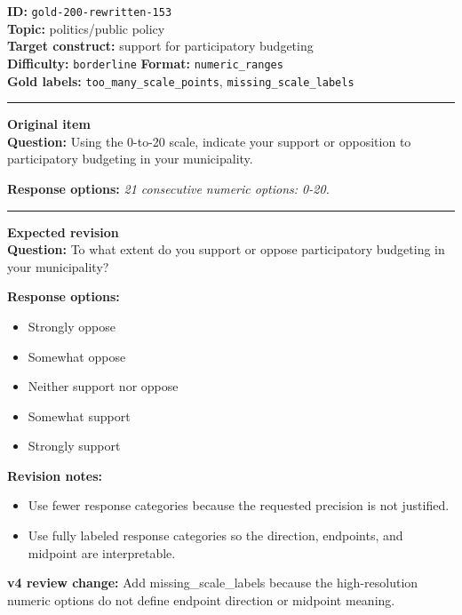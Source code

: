 \documentclass[10pt,a4paper]{article}
\newcommand{\sectionline}{\vspace{0.15em}\hrule\vspace{0.35em}}
\begin{document}
\begin{tcolorbox}[colframe=FlawRed,colback=white,colbacktitle=FlawRed!9,coltitle=black,title={Item 153\hfill Flawed item}]
\textbf{ID:} \texttt{gold-200-rewritten-153}\\
\textbf{Topic:} politics/public policy\\
\textbf{Target construct:} support for participatory budgeting\\
\textbf{Difficulty:} \texttt{borderline} \quad \textbf{Format:} \texttt{numeric\_ranges}\\
\textbf{Gold labels:} \texttt{too\_many\_scale\_points}, \texttt{missing\_scale\_labels}\\
\sectionline
\textbf{Original item}\\
\textbf{Question:} Using the 0-to-20 scale, indicate your support or opposition to participatory budgeting in your municipality.
\par\textbf{Response options:}
\textit{21 consecutive numeric options: 0-20.}
\sectionline
\textbf{Expected revision}\\
\textbf{Question:} To what extent do you support or oppose participatory budgeting in your municipality?
\par\textbf{Response options:}
\begin{itemize}
\item Strongly oppose
\item Somewhat oppose
\item Neither support nor oppose
\item Somewhat support
\item Strongly support
\end{itemize}
\par\textbf{Revision notes:}
\begin{itemize}
\item Use fewer response categories because the requested precision is not justified.
\item Use fully labeled response categories so the direction, endpoints, and midpoint are interpretable.
\end{itemize}
\par\textbf{v4 review change:} Add missing\_scale\_labels because the high-resolution numeric options do not define endpoint direction or midpoint meaning.
\end{tcolorbox}
\end{document}
